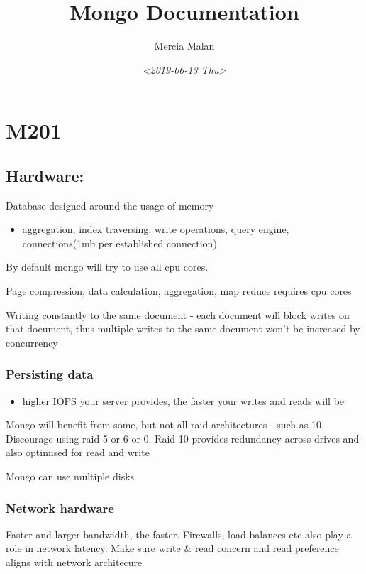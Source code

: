 \documentclass[11pt]{article}
\author{Mercia Malan}
\date{\textit{<2019-06-13 Thu>}}
\title{Mongo Documentation}
\begin{document}
\maketitle
\tableofcontents


\section{M201}
\label{sec:org3045f35}

\subsection{Hardware:}
\label{sec:org3799755}
Database designed around the usage of memory
\begin{itemize}
\item aggregation, index traversing, write operations, query engine, connections(1mb per established connection)
\end{itemize}

By default mongo will try to use all cpu cores.

Page compression, data calculation, aggregation, map reduce requires cpu cores

Writing constantly to the same document - each document will block writes on that document, thus multiple writes to the same document won't be increased by concurrency

\subsubsection{Persisting data}
\label{sec:org774fb98}
\begin{itemize}
\item higher IOPS your server provides, the faster your writes and reads will be
\end{itemize}

Mongo will benefit from some, but not all raid architectures - such as 10. Discourage using raid 5 or 6 or 0. Raid 10 provides redundancy across drives and also optimised for read and write

Mongo can use multiple disks

\subsubsection{Network hardware}
\label{sec:org84b520e}
Faster and larger bandwidth, the faster. Firewalls, load balances etc also play a role in network latency.
Make sure write \& read concern and read preference aligns with network architecure
\end{document}
